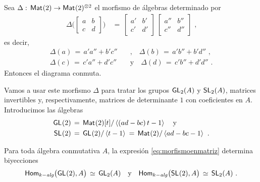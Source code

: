 \begin{propoProductoDeMatrices}\label{propo:productodematrices}
	Sea $\Delta:\,\MM(2)\rightarrow\MM(2)^{\otimes 2}$ el morfismo de
	\'{a}lgebras determinado por
	\begin{align*}
		\Delta\Big(\begin{bmatrix} a & b \\ c & d \end{bmatrix}\Big)
			& \,=\,
			\begin{bmatrix} a' & b' \\ c' & d' \end{bmatrix}\,
			\begin{bmatrix} a'' & b'' \\ c'' & d'' \end{bmatrix}
		\text{ ,}
	\end{align*}
	es decir,
	\begin{equation}
		\label{eq:productodematrices}
		\begin{aligned}
			\Delta(a) \,=\, a'a'' + b'c'' & \quad\text{,}\quad
			\Delta(b) \,=\, a'b'' + b'd'' \text{ ,} \\
			\Delta(c) \,=\, c'a'' + d'c'' & \quad\text{y}\quad
			\Delta(d) \,=\, c'b'' + d'd''
			\text{ .}
		\end{aligned}
	\end{equation}
	Entonces el diagrama conmuta.
\end{propoProductoDeMatrices}

Vamos a usar este morfismo $\Delta$ para tratar los grupos $\GL[2](A)$ y
$\SL[2](A)$, matrices invertibles y, respectivamente, matrices de determinante
$1$ con coeficientes en $A$. Introducimos las \'{a}lgebras
\begin{align*}
	\GL(2) & \,=\,\MM(2)[t]/\generado{(ad-bc)\,t-1}\quad\text{y} \\
	\SL(2) & \,=\,\GL(2)/\generado{t-1}\,=\,
		\MM(2)/\generado{ad-bc-1}
	\text{ .}
\end{align*}
%

\begin{propoLinealGeneral}\label{propo:morfismosdesdelinealgeneral}
	Para toda \'{a}lgebra conmutativa $A$, la expresi\'{o}n
	\eqref{eq:morfismoenmatriz} determina biyecciones
	\begin{equation}
		\label{eq:morfismosdesdelinealgeneral}
		\Homalg\big(\GL(2),A\big) \,\simeq\,\GL[2](A)
			\quad\text{y}\quad
		\Homalg\big(\SL(2),A\big) \,\simeq\,\SL[2](A)
		\text{ .}
	\end{equation}
\end{propoLinealGeneral}

